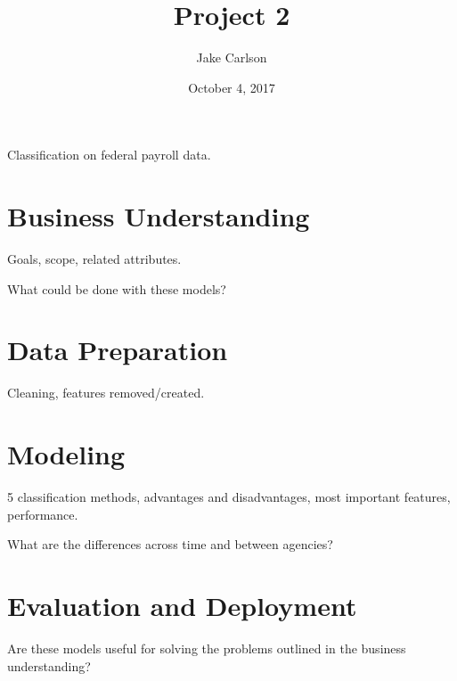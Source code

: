 \documentclass{article}
\begin{document}
\title{Project 2}
\author{Jake Carlson}
\date{October 4, 2017}
\maketitle

\abstract
Classification on federal payroll data.
\newpage

\tableofcontents
\newpage

\section{Business Understanding}
Goals, scope, related attributes.

What could be done with these models?

\section{Data Preparation}
Cleaning, features removed/created.

\section{Modeling}
5 classification methods, advantages and disadvantages, most important features, performance.

What are the differences across time and between agencies?

\section{Evaluation and Deployment}
Are these models useful for solving the problems outlined in the business understanding?
\end{document}
